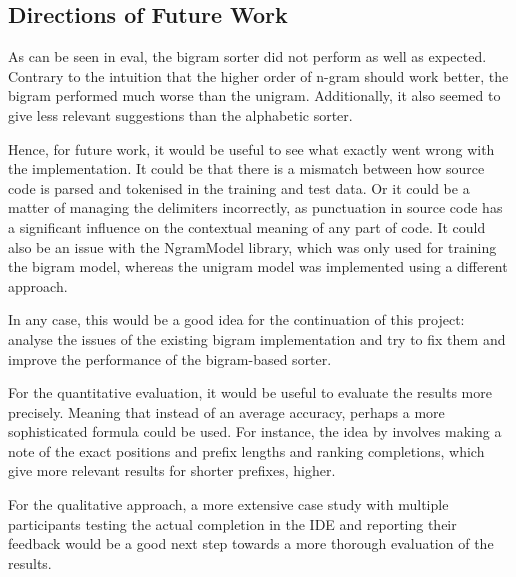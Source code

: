 \documentclass[sigplan,screen]{acmart}
\begin{document}
\subsection{Directions of Future Work}
As can be seen in eval, the bigram sorter did not perform as well as expected. Contrary to the intuition that the higher order of n-gram should work better, the bigram performed much worse than the unigram. Additionally, it also seemed to give less relevant suggestions than the alphabetic sorter.

Hence, for future work, it would be useful to see what exactly went wrong with the implementation. It could be that there is a mismatch between how source code is parsed and tokenised in the training and test data. Or it could be a matter of managing the delimiters incorrectly, as punctuation in source code has a significant influence on the contextual meaning of any part of code. It could also be an issue with the NgramModel library, which was only used for training the bigram model, whereas the unigram model was implemented using a different approach.

In any case, this would be a good idea for the continuation of this project: analyse the issues of the existing bigram implementation and try to fix them and improve the performance of the bigram-based sorter. 

For the quantitative evaluation, it would be useful to evaluate the results more precisely. Meaning that instead of an average accuracy, perhaps a more sophisticated formula could be used. For instance, the idea by \cite{Robb08a} involves making a note of the exact positions and prefix lengths and ranking completions, which give more relevant results for shorter prefixes, higher.

For the qualitative approach, a more extensive case study with multiple participants testing the actual completion in the IDE and reporting their feedback would be a good next step towards a more thorough evaluation of the results.



\end{document}
